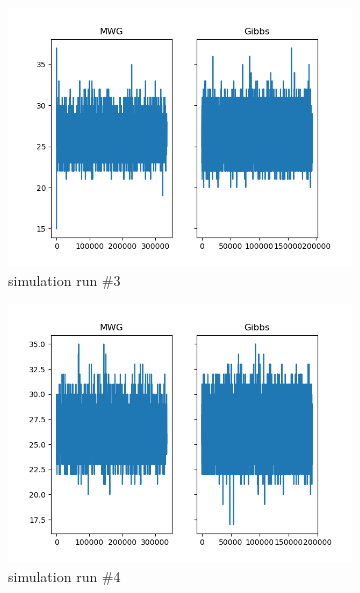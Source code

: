 \begin{figure}[H]
\begin{subfigure}{.3\textwidth}
    	\includegraphics[width=\linewidth]{../../plots/Trace_post_burnin_M2_N50_NMCMC1_seed2_diffind2.png}
    	\caption{simulation run \#3}
	\end{subfigure}
	\begin{subfigure}{.3\textwidth}
	    \centering
    	\includegraphics[width=\linewidth]{../../plots/Trace_post_burnin_M2_N50_NMCMC1_seed3_diffind2.png}
    	\caption{simulation run \#4}
	\end{subfigure}
	\begin{subfigure}{.3\textwidth}
	    \centering

\end{subfigure}
\end{figure}

